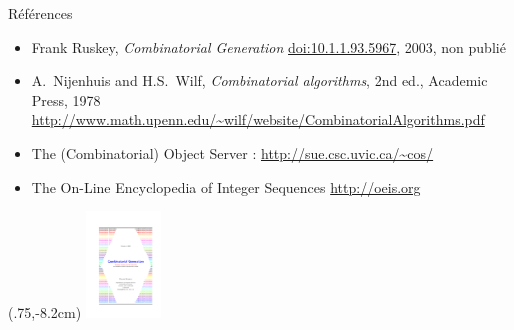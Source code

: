 \documentclass[12pt]{beamer}
\begin{document}
\begin{frame}{Références}

  \begin{itemize}
  \item Frank Ruskey, \textit{Combinatorial Generation}
    \url{doi:10.1.1.93.5967}, 2003, non publié
    \bigskip

  \item A.~Nijenhuis and H.S.~Wilf, \textit{Combinatorial algorithms}, 2nd
    ed., Academic Press, 1978\\
    \url{http://www.math.upenn.edu/~wilf/website/CombinatorialAlgorithms.pdf}
    \bigskip

  \item The (Combinatorial) Object Server : \url{http://sue.csc.uvic.ca/~cos/}
    \bigskip

  \item The On-Line Encyclopedia of Integer Sequences \url{http://oeis.org}
  \end{itemize}
  \begin{textblock*}{100mm}(.75\textwidth,-8.2cm)
    \includegraphics[width=2cm]{media/RuskeyCombGen-1.pdf}
  \end{textblock*}
\end{frame}
\end{document}
